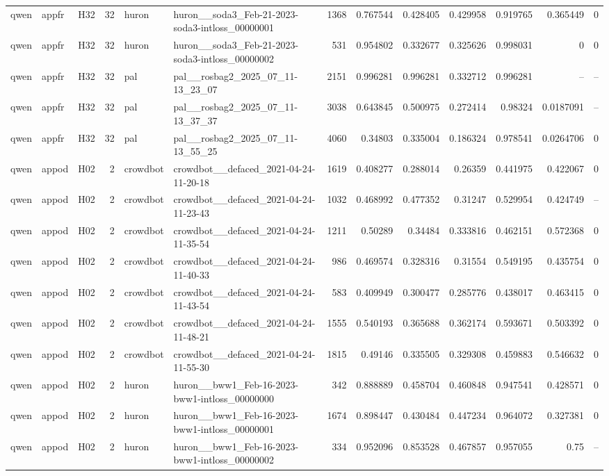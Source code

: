 \begin{longtable}{lllrllrrrrrrr}
qwen & appfr & H32 & 32 & huron & huron\_\_soda3\_Feb-21-2023-soda3-intloss\_00000001 & 1368 & 0.767544 & 0.428405 & 0.429958 & 0.919765 & 0.365449 & 0 \\
qwen & appfr & H32 & 32 & huron & huron\_\_soda3\_Feb-21-2023-soda3-intloss\_00000002 & 531 & 0.954802 & 0.332677 & 0.325626 & 0.998031 & 0 & 0 \\
qwen & appfr & H32 & 32 & pal & pal\_\_rosbag2\_2025\_07\_11-13\_23\_07 & 2151 & 0.996281 & 0.996281 & 0.332712 & 0.996281 & -- & -- \\
qwen & appfr & H32 & 32 & pal & pal\_\_rosbag2\_2025\_07\_11-13\_37\_37 & 3038 & 0.643845 & 0.500975 & 0.272414 & 0.98324 & 0.0187091 & -- \\
qwen & appfr & H32 & 32 & pal & pal\_\_rosbag2\_2025\_07\_11-13\_55\_25 & 4060 & 0.34803 & 0.335004 & 0.186324 & 0.978541 & 0.0264706 & 0 \\
qwen & appod & H02 & 2 & crowdbot & crowdbot\_\_defaced\_2021-04-24-11-20-18 & 1619 & 0.408277 & 0.288014 & 0.26359 & 0.441975 & 0.422067 & 0 \\
qwen & appod & H02 & 2 & crowdbot & crowdbot\_\_defaced\_2021-04-24-11-23-43 & 1032 & 0.468992 & 0.477352 & 0.31247 & 0.529954 & 0.424749 & -- \\
qwen & appod & H02 & 2 & crowdbot & crowdbot\_\_defaced\_2021-04-24-11-35-54 & 1211 & 0.50289 & 0.34484 & 0.333816 & 0.462151 & 0.572368 & 0 \\
qwen & appod & H02 & 2 & crowdbot & crowdbot\_\_defaced\_2021-04-24-11-40-33 & 986 & 0.469574 & 0.328316 & 0.31554 & 0.549195 & 0.435754 & 0 \\
qwen & appod & H02 & 2 & crowdbot & crowdbot\_\_defaced\_2021-04-24-11-43-54 & 583 & 0.409949 & 0.300477 & 0.285776 & 0.438017 & 0.463415 & 0 \\
qwen & appod & H02 & 2 & crowdbot & crowdbot\_\_defaced\_2021-04-24-11-48-21 & 1555 & 0.540193 & 0.365688 & 0.362174 & 0.593671 & 0.503392 & 0 \\
qwen & appod & H02 & 2 & crowdbot & crowdbot\_\_defaced\_2021-04-24-11-55-30 & 1815 & 0.49146 & 0.335505 & 0.329308 & 0.459883 & 0.546632 & 0 \\
qwen & appod & H02 & 2 & huron & huron\_\_bww1\_Feb-16-2023-bww1-intloss\_00000000 & 342 & 0.888889 & 0.458704 & 0.460848 & 0.947541 & 0.428571 & 0 \\
qwen & appod & H02 & 2 & huron & huron\_\_bww1\_Feb-16-2023-bww1-intloss\_00000001 & 1674 & 0.898447 & 0.430484 & 0.447234 & 0.964072 & 0.327381 & 0 \\
qwen & appod & H02 & 2 & huron & huron\_\_bww1\_Feb-16-2023-bww1-intloss\_00000002 & 334 & 0.952096 & 0.853528 & 0.467857 & 0.957055 & 0.75 & -- \\

\end{longtable}
